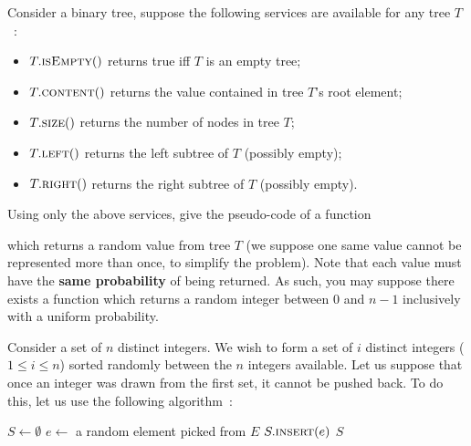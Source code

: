 \documentclass[12pt,addpoints]{exam}
\newcommand{\bigo}{\mathcal{O}}
\begin{document}
\begin{questions}
\question
Consider a binary tree, suppose the following services are available for any tree $T$~:
\begin{itemize}
  \item $T.\Call{isEmpty}$ returns true iff $T$ is an empty tree;
  \item $T.\Call{content}$ returns the value contained in tree $T$'s root element;
  \item $T.\Call{size}$ returns the number of nodes in tree $T$;
  \item $T.\Call{left}$ returns the left subtree of $T$ (possibly empty);
  \item $T.\Call{right}$ returns the right subtree of $T$ (possibly empty).
\end{itemize}
Using only the above services, give the pseudo-code of a function
\begin{center}
\end{center}
which returns a random value from tree $T$ (we suppose one same value cannot be represented more than once, to simplify the problem).
Note that each value must have the \textbf{same probability} of being returned.
As such, you may suppose there exists a  function which returns a random integer between $0$ and $n - 1$ inclusively with a uniform probability.

\question
Consider a set of $n$ distinct integers.
We wish to form a set of $i$ distinct integers ($1 \leq i \leq n$) sorted randomly between the $n$ integers available.
Let us suppose that once an integer was drawn from the first set, it cannot be pushed back.
To do this, let us use the following algorithm~:
\begin{algorithmic}[1]
    \State $S \gets \emptyset$
      \State $e \gets $ a random element picked from $E$
        \State $S.\Call{insert}{e}$
      \EndIf
    \EndWhile
    \State \Return $S$
  \EndFunction
\end{algorithmic}


\end{questions}
\end{document}
